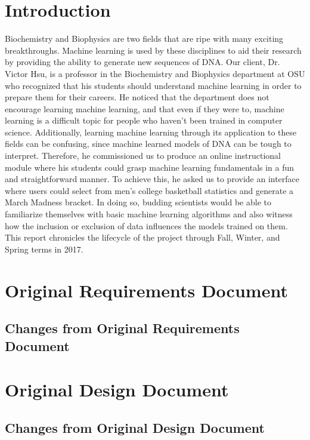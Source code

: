 \documentclass[onecolumn, draftclsnofoot,10pt, compsoc]{IEEEtran}
\begin{document}
\section{Introduction}
Biochemistry and Biophysics are two fields that are ripe with many exciting breakthroughs. Machine learning is used by these disciplines to aid their research by providing the ability to generate new sequences of DNA. Our client, Dr. Victor Hsu, is a professor in the Biochemistry and Biophysics department at OSU who recognized that his students should understand machine learning in order to prepare them for their careers. He noticed that the department does not encourage learning machine learning, and that even if they were to, machine learning is a difficult topic for people who haven't been trained in computer science. Additionally, learning machine learning through its application to these fields can be confusing, since machine learned models of DNA can be tough to interpret. Therefore, he commissioned us to produce an online instructional module where his students could grasp machine learning fundamentals in a fun and straightforward manner. To achieve this, he asked us to provide an interface where users could select from men's college basketball statistics and generate a March Madness bracket. In doing so, budding scientists would be able to familiarize themselves with basic machine learning algorithms and also witness how the inclusion or exclusion of data influences the models trained on them. This report chronicles the lifecycle of the project through Fall, Winter, and Spring terms in 2017.

\section{Original Requirements Document}

\subsection{Changes from Original Requirements Document}

\section{Original Design Document}

\subsection{Changes from Original Design Document}
\end{document}
